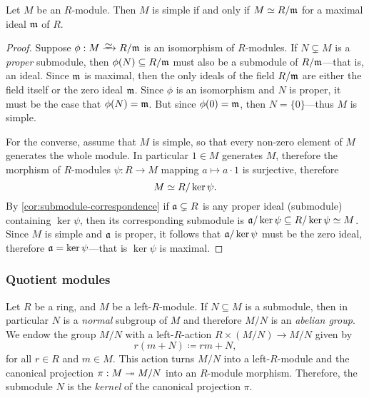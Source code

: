\begin{proposition}
    \label{prop:simple-mod-iff-iso-R/a-with-maximal}
    Let \(M\) be an \(R\)-module. Then \(M\) is simple if and only if \(M \simeq
    R/\mathfrak{m}\) for a maximal ideal \(\mathfrak{m}\) of \(R\).
\end{proposition}

\begin{proof}
    Suppose \(\phi: M \isoto R/\ideal m\) is an isomorphism of \(R\)-modules. If
    \(N \subsetneq M\) is a \emph{proper} submodule, then
    \(\phi(N) \subseteq R/\mathfrak{m}\) must also be a submodule of
    \(R/\mathfrak{m}\)---that is, an ideal. Since \(\mathfrak{m}\) is maximal, then the only
    ideals of the field \(R/\mathfrak{m}\) are either the field itself or the zero ideal
    \(\mathfrak{m}\). Since \(\phi\) is an isomorphism and \(N\) is proper, it must be
    the case that \(\phi(N) = \mathfrak{m}\). But since \(\phi(0) = \mathfrak{m}\), then
    \(N = \{0\}\)---thus \(M\) is simple.

    For the converse, assume that \(M\) is simple, so that every non-zero element of
    \(M\) generates the whole module. In particular \(1 \in M\) generates \(M\),
    therefore the morphism of \(R\)-modules \(\psi: R \to M\) mapping
    \(a \mapsto a \cdot 1\) is surjective, therefore
    \[
        M \simeq R/\ker \psi.
    \]
    By \cref{cor:submodule-correspondence} if \(\mathfrak{a} \subsetneq R\) is any
    proper ideal (submodule) containing \(\ker \psi\), then its corresponding
    submodule is \(\mathfrak{a}/\ker \psi \subseteq R/\ker \psi \simeq M\). Since \(M\)
    is simple and \(\mathfrak{a}\) is proper, it follows that \(\mathfrak{a}/\ker \psi\)
    must be the zero ideal, therefore \(\mathfrak{a} = \ker \psi\)---that is
    \(\ker \psi\) is maximal.
\end{proof}

\subsubsection{Quotient modules}

\begin{definition}
    \label{def:quotient-module}
    Let \(R\) be a ring, and \(M\) be a left-\(R\)-module. If \(N \subseteq M\) is a
    submodule, then in particular \(N\) is a \emph{normal} subgroup of \(M\) and
    therefore \(M/N\) is an \emph{abelian group}. We endow the group \(M/N\) with a
    left-\(R\)-action \(R \times (M/N) \to M/N\) given by
    \[
        r (m + N) \coloneq r m + N,
    \]
    for all \(r \in R\) and \(m \in M\). This action turns \(M/N\) into a
    left-\(R\)-module and the canonical projection \(\pi: M \twoheadrightarrow M/N\) into an
    \(R\)-module morphism. Therefore, the submodule \(N\) is the \emph{kernel} of
    the canonical projection \(\pi\).
\end{definition}

